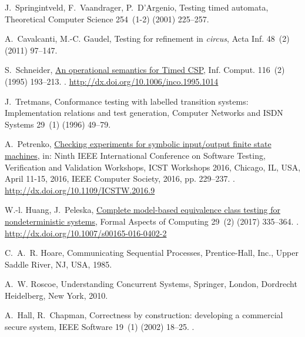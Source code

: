 \documentclass[3p,times]{elsarticle}
\begin{document}
\begin{thebibliography}{10}
J.~Springintveld, F.~Vaandrager, P.~D'Argenio, Testing timed automata,
  Theoretical Computer Science 254~(1-2) (2001) 225--257.

A.~Cavalcanti, M.-C. Gaudel, Testing for refinement in {\it circus}, Acta Inf.
  48~(2) (2011) 97--147.

S.~Schneider, \href{http://dx.doi.org/10.1006/inco.1995.1014}{An operational
  semantics for Timed CSP}, Inf. Comput. 116~(2) (1995) 193--213.
\newblock \href {http://dx.doi.org/10.1006/inco.1995.1014}
  {}.
\newline\urlprefix\url{http://dx.doi.org/10.1006/inco.1995.1014}

J.~Tretmans, Conformance testing with labelled transition systems:
  Implementation relations and test generation, Computer Networks and ISDN
  Systems 29~(1) (1996) 49--79.

A.~Petrenko, \href{http://dx.doi.org/10.1109/ICSTW.2016.9}{Checking experiments
  for symbolic input/output finite state machines}, in: Ninth {IEEE}
  International Conference on Software Testing, Verification and Validation
  Workshops, {ICST} Workshops 2016, Chicago, IL, USA, April 11-15, 2016, {IEEE}
  Computer Society, 2016, pp. 229--237.
\newblock \href {http://dx.doi.org/10.1109/ICSTW.2016.9}
  {}.
\newline\urlprefix\url{http://dx.doi.org/10.1109/ICSTW.2016.9}

W.-l. Huang, J.~Peleska,
  \href{http://dx.doi.org/10.1007/s00165-016-0402-2}{Complete model-based
  equivalence class testing for nondeterministic systems}, Formal Aspects of
  Computing 29~(2) (2017) 335--364.
\newblock \href {http://dx.doi.org/10.1007/s00165-016-0402-2}
  {}.
\newline\urlprefix\url{http://dx.doi.org/10.1007/s00165-016-0402-2}

C.~A.~R. Hoare, Communicating Sequential Processes, Prentice-Hall, Inc., Upper
  Saddle River, NJ, USA, 1985.

A.~W. Roscoe, Understanding Concurrent Systems, Springer, London, Dordrecht
  Heidelberg, New York, 2010.

A.~Hall, R.~Chapman, Correctness by construction: developing a commercial
  secure system, IEEE Software 19~(1) (2002) 18--25.
\newblock \href {http://dx.doi.org/10.1109/52.976937}
  {}.


\end{thebibliography}
\end{document}

